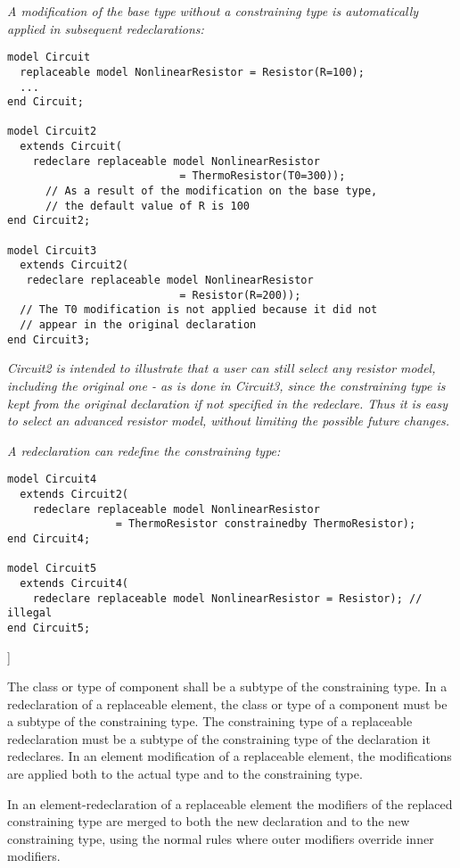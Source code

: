 \emph{A modification of the base type without a constraining type is
automatically applied in subsequent redeclarations:}
\begin{lstlisting}[language=modelica]
model Circuit
  replaceable model NonlinearResistor = Resistor(R=100);
  ...
end Circuit;

model Circuit2
  extends Circuit(
    redeclare replaceable model NonlinearResistor
                           = ThermoResistor(T0=300));
      // As a result of the modification on the base type,
      // the default value of R is 100
end Circuit2;

model Circuit3
  extends Circuit2(
   redeclare replaceable model NonlinearResistor
                           = Resistor(R=200));
  // The T0 modification is not applied because it did not
  // appear in the original declaration
end Circuit3;
\end{lstlisting}

\emph{Circuit2 is intended to illustrate that a user can still select
any resistor model, including the original one - as is done in Circuit3,
since the constraining type is kept from the original declaration if not
specified in the redeclare. Thus it is easy to select an advanced
resistor model, without limiting the possible future changes. }

\emph{A redeclaration can redefine the constraining type:}
\begin{lstlisting}[language=modelica]
model Circuit4
  extends Circuit2(
    redeclare replaceable model NonlinearResistor
                 = ThermoResistor constrainedby ThermoResistor);
end Circuit4;

model Circuit5
  extends Circuit4(
    redeclare replaceable model NonlinearResistor = Resistor); // illegal
end Circuit5;
\end{lstlisting}

{]}

The class or type of component shall be a subtype of the constraining
type. In a redeclaration of a replaceable element, the class or type of
a component must be a subtype of the constraining type. The constraining
type of a replaceable redeclaration must be a subtype of the
constraining type of the declaration it redeclares. In an element
modification of a replaceable element, the modifications are applied
both to the actual type and to the constraining type.

In an element-redeclaration of a replaceable element the modifiers of
the replaced constraining type are merged to both the new declaration
and to the new constraining type, using the normal rules where outer
modifiers override inner modifiers.

